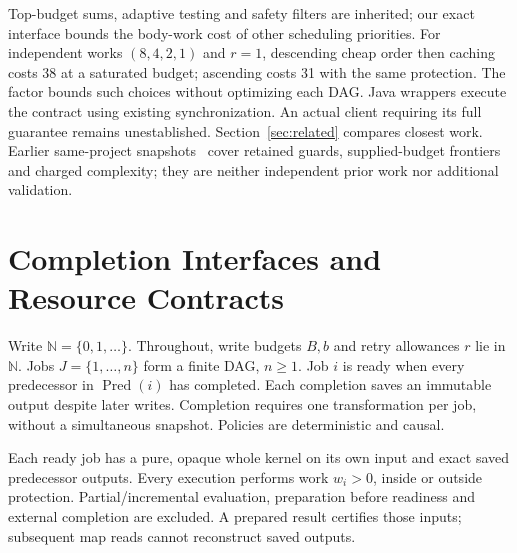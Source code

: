 \documentclass[acmsmall,screen,review,anonymous]{acmart}
\newcommand{\N}{\mathbb{N}}
\begin{document}
Top-budget sums, adaptive testing and safety filters are inherited; our exact interface bounds the body-work cost of other scheduling priorities. For independent works $(8,4,2,1)$ and $r=1$, descending cheap order then caching costs 38 at a saturated budget; ascending costs 31 with the same protection. The factor bounds such choices without optimizing each DAG. Java wrappers execute the contract using existing synchronization. An actual client requiring its full guarantee remains unestablished. Section~\ref{sec:related} compares closest work. Earlier same-project snapshots~\cite{artifact,chargedartifact} cover retained guards, supplied-budget frontiers and charged complexity; they are neither independent prior work nor additional validation.

\section{Completion Interfaces and Resource Contracts}
\label{sec:interface}

Write $\N=\{0,1,\ldots\}$. Throughout, write budgets $B,b$ and retry allowances $r$ lie in $\N$. Jobs $J=\{1,\ldots,n\}$ form a finite DAG, $n\ge1$. Job $i$ is ready when every predecessor in $\operatorname{Pred}(i)$ has completed. Each completion saves an immutable output despite later writes. Completion requires one transformation per job, without a simultaneous snapshot. Policies are deterministic and causal.

Each ready job has a pure, opaque whole kernel on its own input and exact saved predecessor outputs. Every execution performs work $w_i>0$, inside or outside protection. Partial/incremental evaluation, preparation before readiness and external completion are excluded. A prepared result certifies those inputs; subsequent map reads cannot reconstruct saved outputs.
\end{document}
